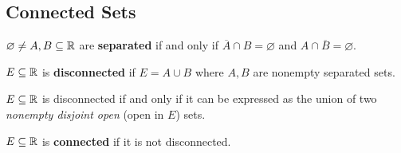 \documentclass[11pt]{article}
\begin{document}
	\subsection{Connected Sets}
	\begin{definition}
		$\varnothing \neq A, B \subseteq \mathbb{R}$ are \textbf{separated} if and only if $\overline{A} \cap B = \varnothing$ and $A \cap \overline{B} = \varnothing$.
	\end{definition}
	
	\begin{definition}
		$E \subseteq \mathbb{R}$ is \textbf{disconnected} if $E = A \cup B$ where $A, B$ are nonempty separated sets.
	\end{definition}
	
	\begin{proposition}
		$E \subseteq \mathbb{R}$ is disconnected if and only if it can be expressed as the union of two \emph{nonempty disjoint open} (open in $E$) sets.
	\end{proposition}
	
	
	\begin{definition}
		$E \subseteq \mathbb{R}$ is \textbf{connected} if it is not disconnected.
	\end{definition}
	
\end{document}
